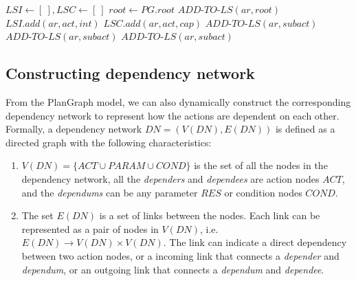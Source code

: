 {\footnotesize
\begin{algorithm}
\begin{algorithmic}[1]
	\State $LSI\gets [\:], LSC\gets [\:]$
	\State $root\gets PG.root$
	\State $ADD\textrm{-}TO\textrm{-}LS(ar, root)$
\EndProcedure
{}
   			\State $LSI.add(ar, act, int)$
   		\EndIf
	\EndFor
   			\State $LSC.add(ar, act, cap)$
   		\EndIf
	\EndFor
   			\State $ADD\textrm{-}TO\textrm{-}LS(ar, subact)$
		\EndFor
	\EndFor
   			\State $ADD\textrm{-}TO\textrm{-}LS(ar, subact)$
		\EndFor
	\EndFor
   		\State $ADD\textrm{-}TO\textrm{-}LS(ar, subact)$
	\EndFor
\EndProcedure
\end{algorithmic}
\end{algorithm}
}

\subsection{Constructing dependency network} %
\label{sub:representing_dependencies}
From the PlanGraph model, we can also dynamically construct the corresponding dependency network to represent how the actions are dependent on each other. Formally, a dependency network $DN=(V(DN), E(DN))$ is defined as a directed graph with the following characteristics:
\begin{enumerate}
	\item $V(DN)=\{ACT \cup PARAM \cup COND\}$ is the set of all the nodes in the dependency network, all the \emph{dependers} and \emph{dependees} are action nodes $ACT$, and the \emph{dependums} can be any parameter $RES$ or condition nodes $COND$. 
	\item The set $E(DN)$ is a set of links between the nodes. Each link can be represented as a pair of nodes in $V(DN)$, i.e. $E(DN) \to V(DN) \times V(DN)$. The link can indicate a direct dependency between two action nodes, or a incoming link that connects a \emph{depender} and \emph{dependum}, or an outgoing link that connects a \emph{dependum} and \emph{dependee}.
\end{enumerate}

